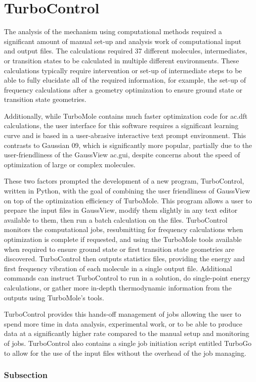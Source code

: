 \chapter{TurboControl}\label{chap.turbocontrol}

The analysis of the mechanism using computational methods required a significant amount of manual set-up and analysis work of computational input and output files. The calculations required 37 different molecules, intermediates, or transition states to be calculated in multiple different environments. These calculations typically require intervention or set-up of intermediate steps to be able to fully elucidate all of the required information, for example, the set-up of frequency calculations after a geometry optimization to ensure ground state or transition state geometries. 

Additionally, while TurboMole contains much faster optimization code for \gls{ac.dft} calculations, the user interface for this software requires a significant learning curve and is based in a user-abrasive interactive text prompt environment. This contrasts to Gaussian 09, which is significantly more popular, partially due to the user-friendliness of the GaussView \gls{ac.gui}, despite concerns about the speed of optimization of large or complex molecules.

These two factors prompted the development of a new program, TurboControl, written in Python, with the goal of combining the user friendliness of GaussView on top of the optimization efficiency of TurboMole. This program allows a user to prepare the input files in GaussView, modify them slightly in any text editor available to them, then run a batch calculation on the files. TurboControl monitors the computational jobs, resubmitting for frequency calculations when optimization is complete if requested, and using the TurboMole tools available when required to ensure ground state or first transition state geometries are discovered. TurboControl then outputs statistics files, providing the energy and first frequency vibration of each molecule in a single output file. Additional commands can instruct TurboControl to run in a solution, do single-point energy calculations, or gather more in-depth thermodynamic information from the outputs using TurboMole's tools. 

TurboControl provides this hands-off management of jobs allowing the user to spend more time in data analysis, experimental work, or to be able to produce data at a significantly higher rate compared to the manual setup and monitoring of jobs. TurboControl also contains a single job initiation script entitled TurboGo to allow for the use of the input files without the overhead of the job managing.\autocite{bulsink2014}

\subsection{Subsection}



